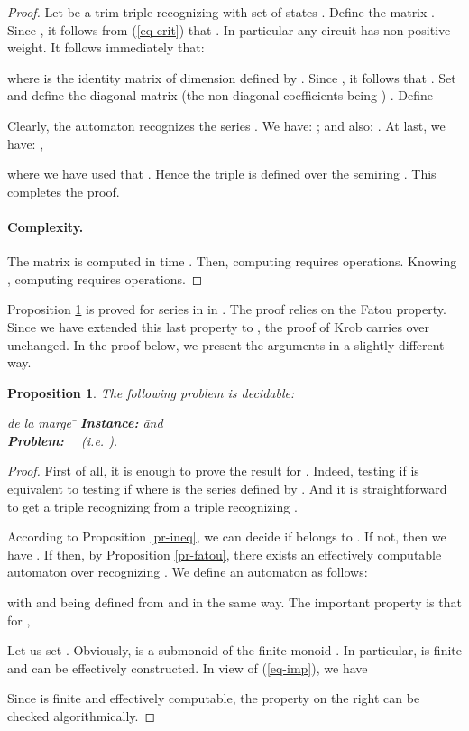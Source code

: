 \documentclass{article}
\newtheorem{prpstn}[thrm]{Proposition}
\newcommand{\1}{\mathbb{1}}
\newcommand{\0}{\mathbb{0}}
\begin{document}
\begin{proof}
Let  be a trim triple recognizing  with set of
states . 
Define the matrix . Since , it follows from (\ref{eq-crit}) that
. In particular any circuit has non-positive weight. It
follows immediately that:

where  is the identity matrix of dimension  defined by
. 
Since , it follows that .
Set  and define the diagonal matrix (the non-diagonal coefficients
being ) . Define

Clearly, the automaton  
recognizes the  series .  
We have: ; and also: . At last, we have:
,

where we have used that .
Hence the triple 
is defined over the semiring . This completes the proof. 



\paragraph{Complexity.}
The matrix  is computed in time . 
Then, computing  requires  operations. Knowing ,
computing 
 requires
 operations. 
\end{proof}

Proposition \ref{pr-eq} is proved for series in
 in \cite[Proposition 5.1]{krob94}.
The proof relies on the Fatou property. Since
we have extended this last property to , the
proof of Krob carries over unchanged. In the proof below, we present
the arguments in a slightly different way. 

\begin{prpstn}
\label{pr-eq}
The following problem is decidable:
\begin{tabbing} 
de la marge \= \kill
\> {\bf Instance:} \hspace*{0.4cm} \=  and
 \\
\>  {\bf Problem:} \>  \ \
(i.e. )\:.
\end{tabbing}
\end{prpstn} 

\begin{proof}
First of all, it is enough to prove the result for . Indeed,
testing if  is equivalent to testing if
 where  is  
the series defined by . And it is
straightforward to get a triple recognizing  from a triple
recognizing . 

According to 
Proposition \ref{pr-ineq}, we can decide if  belongs to
. If not, then we have . If  then, by Proposition \ref{pr-fatou}, there exists an
effectively computable automaton  over  recognizing . 
We define an automaton
 as follows: 

with  and  being defined from
 and  in the same
way. 
The important property is that for , 

Let us set 
. Obviously,  is a submonoid
of the finite monoid . In particular,
 is finite and can be effectively
constructed. In view of (\ref{eq-imp}), we have

Since  is finite and effectively computable,
the property on the right can be checked algorithmically. 
\end{proof}
\end{document}
